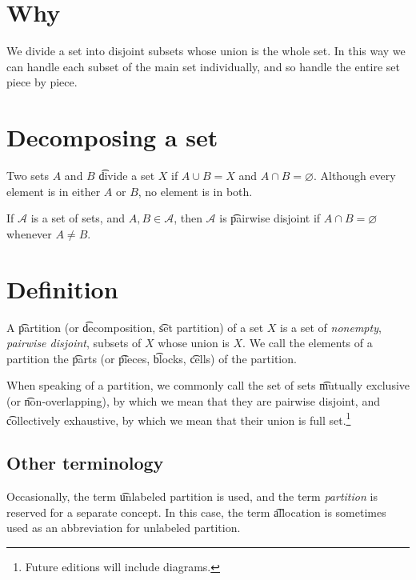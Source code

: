 
\section*{Why}

We divide a set into disjoint subsets whose union is the whole set.
In this way we can handle each subset of the main set individually, and so handle the entire set piece by piece.

\section*{Decomposing a set}

Two sets $A$ and $B$ \t{divide} a set $X$ if $A \cup B = X$ and $A \cap  B = \varnothing$.
Although every element is in either $A$ or $B$, no element is in both.

If $\mathcal{A} $ is a set of sets, and $A, B \in \mathcal{A} $, then $\mathcal{A} $ is \t{pairwise disjoint} if $A \cap  B = \varnothing$ whenever $A \neq B$.

\section*{Definition}

A \t{partition} (or \t{decomposition}, \t{set partition}) of a set $X$ is a set of \textit{nonempty}, \textit{pairwise disjoint}, subsets of $X$ whose union is $X$.
We call the elements of a partition the \t{parts} (or \t{pieces}, \t{blocks}, \t{cells}) of the partition.

When speaking of a partition, we commonly call the set of sets \t{mutually exclusive} (or \t{non-overlapping}), by which we mean that they are pairwise disjoint, and \t{collectively exhaustive}, by which we mean that their union is full set.\footnote{Future editions will include diagrams.}

\subsection*{Other terminology}

Occasionally, the term \t{unlabeled partition} is used, and the term \textit{partition} is reserved for a separate concept.
In this case, the term \t{allocation} is sometimes used as an abbreviation for unlabeled partition.


\blankpage
